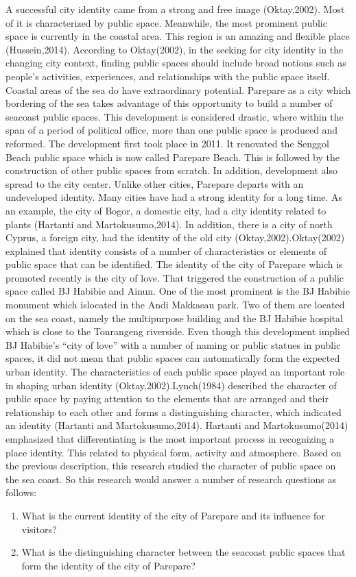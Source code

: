 \documentclass[11pt]{simart} %
\begin{document}
A successful city identity came from a strong and free image (Oktay,2002). Most of it is characterized by public space. Meanwhile, the most prominent public space is currently in the coastal area. This region is an amazing and flexible place (Hussein,2014). According to Oktay(2002), in the seeking for city identity in the changing city context, finding public spaces should include broad notions such as people's activities, experiences, and relationships with the public space itself.
Coastal areas of the sea do have extraordinary potential. Parepare as a city which bordering of the sea takes advantage of this opportunity to build a number of seacoast public spaces. This development is considered drastic, where within the span of a period of political office, more than one public space is produced and reformed. The development first took place in 2011. It renovated the Senggol Beach public space which is now called Parepare Beach. This is followed by the construction of other public spaces from scratch. In addition, development also spread to the city center.
Unlike other cities, Parepare departs with an undeveloped identity. Many cities have had a strong identity for a long time. As an example, the city of Bogor, a domestic city, had a city identity related to plants (Hartanti and Martokusumo,2014). In addition, there is a city of north Cyprus, a foreign city, had the identity of the old city (Oktay,2002).Oktay(2002) explained that identity consists of a number of characteristics or elements of public space that can be identified.
The identity of the city of Parepare which is promoted recently is the city of love. That triggered the construction of a public space called BJ Habibie and Ainun. One of the most prominent is the BJ Habibie monument which islocated in the Andi Makkasau park. Two of them are located on the sea coast, namely the multipurpose building and the BJ Habibie hospital which is close to the Tonrangeng riverside. Even though this development implied BJ Habibie's “city of love” with a number of naming or public statues in public spaces, it did not mean that public spaces can automatically form the expected urban identity.
The characteristics of each public space played an important role in shaping urban identity (Oktay,2002).Lynch(1984) described the character of public space by paying attention to the elements that are arranged and their relationship to each other and forms a distinguishing character, which indicated an identity (Hartanti and Martokusumo,2014). Hartanti and Martokusumo(2014) emphasized that differentiating is the most important process in recognizing a place identity. This related to physical form, activity and atmosphere. Based on the previous description, this research studied the character of public space on the sea coast. So this research would answer a number of research questions as follows:
\begin{enumerate}
\item What is the current identity of the city of Parepare and its influence for visitors?
\item What is the distinguishing character between the seacoast public spaces that form the identity of the city of Parepare?
\end{enumerate}
\end{document}

